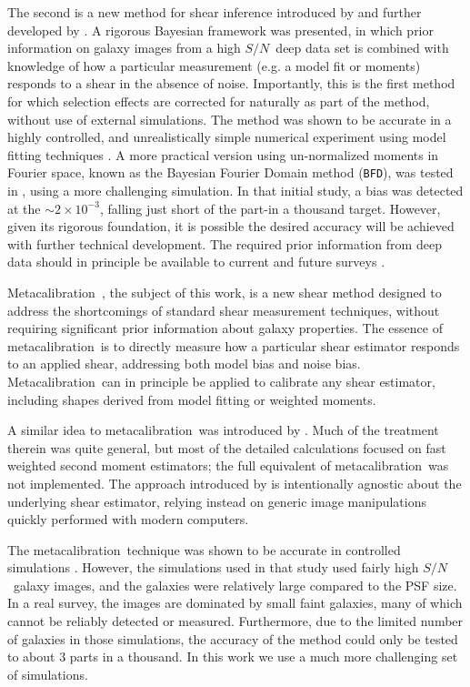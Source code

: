 \documentclass[iop]{emulateapj}
\newcommand{\snr}{$S/N$}
\newcommand{\mcal}{metacalibration}
\newcommand{\Mcal}{Metacalibration}
\newcommand{\bfd}{\texttt{BFD}}
\begin{document}
The second is a new method for shear inference introduced by \cite{ba14} and
further developed by \cite{bfd2016}.  A rigorous Bayesian framework was
presented, in which prior information on galaxy images from a high \snr\ deep
data set is combined with knowledge of how a particular measurement (e.g. a
model fit or moments) responds to a shear in the absence of noise.
Importantly, this is the first method for which selection effects are corrected
for naturally as part of the method, without use of external simulations.  The
method was shown to be accurate in a highly controlled, and unrealistically
simple numerical experiment using model fitting techniques \citep{Sheldon2014}.
A more practical version using un-normalized moments in Fourier space, known as
the Bayesian Fourier Domain method (\bfd), was tested in \cite{bfd2016}, using
a more challenging simulation.  In that initial study, a bias was detected at
the $\sim 2 \times 10^{-3}$, falling just short of the part-in a thousand
target.  However, given its rigorous foundation, it is possible the desired
accuracy will be achieved with further technical development.  The required
prior information from deep data should in principle be available to current
and future surveys
\citep{DESWhitePaper,TakadaHSC2010,IvezicLSST08,Euclid2011,SpergelWFIRST2015}.

\Mcal\ \citep{HuffMcal}, the subject of this work, is a new shear
method designed to address the shortcomings of standard shear measurement
techniques, without requiring significant prior information about galaxy
properties.  The essence of \mcal\ is to directly measure how a particular
shear estimator responds to an applied shear, addressing both model bias and
noise bias.  \Mcal\ can in principle be applied to calibrate any shear
estimator, including shapes derived from model fitting or weighted moments.

A similar idea to \mcal\ was introduced by \cite{Kaiser2000}.  Much of the
treatment therein was quite general, but most of the detailed calculations
focused on fast weighted second moment estimators; the full equivalent of
\mcal\ was not implemented.  The approach introduced by \citep{HuffMcal} is
intentionally agnostic about the underlying shear estimator, relying instead on
generic image manipulations quickly performed with modern computers. 

The \mcal\ technique was shown to be accurate in controlled simulations
\citep{HuffMcal}.  However, the simulations used in that study \citep[based on
those used in][]{great3} used fairly high \snr\ galaxy images, and the galaxies
were relatively large compared to the PSF size.  In a real survey, the images
are dominated by small faint galaxies, many of which cannot be reliably
detected or measured.  Furthermore, due to the limited number of galaxies in
those simulations, the accuracy of the method could only be tested to about 3
parts in a thousand.  In this work we use a much more challenging set of
simulations.
\end{document}
